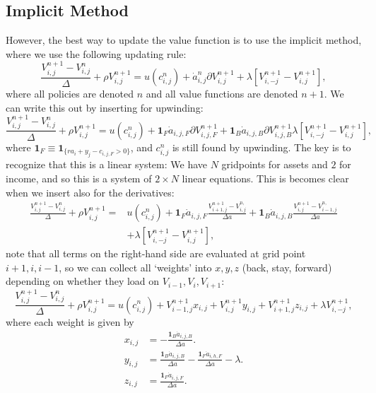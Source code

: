 \documentclass[12pt]{article}
\DeclareMathOperator{\1}{\mathbbm{1}}
\begin{document}
\subsection{Implicit Method}\label{sec:implicitmethod}
However, the best way to update the value function is to use the implicit method, where we use the following updating rule:
\begin{equation}
\frac{V^{n+1}_{i,j} - V^n_{i,j}}\Delta + \rho V^{n+1}_{i,j} =u(c^n_{i,j}) + \dot a^n_{i,j} \partial V^{n+1}_{i,j} + \lambda [V^{n+1}_{i,-j} - V^{n+1}_{i,j}],
\end{equation}
where all policies are denoted $n$ and all value functions are denoted $n+1$. We can write this out by inserting for upwinding:
\begin{equation}
\frac{V^{n+1}_{i,j} - V^n_{i,j}}{\Delta} +  \rho V^{n+1}_{i,j} =u(c^n_{i,j}) + \mathbf{1}_F\dot a_{i,j,F} \partial V^{n+1}_{i,j,F} + \mathbf{1}_B \dot a_{i,j,B} \partial V^{n+1}_{i,j,B} \lambda [V^{n+1}_{i,-j} - V^{n+1}_{i,j}],
\end{equation}
where $\mathbf{1}_F \equiv \mathbf{1}_{\{ra_i + y_j - c_{i,j,F}>0\}}$, and  $c^n_{i,j}$ is still found by upwinding. The key is to recognize that this is a linear system: We have $N$ gridpoints for assets and $2$ for income, and so this is a system of $2\times N$ linear equations. This is becomes clear when we insert also for the derivatives:
\begin{equation}
\begin{split}
\frac{V^{n+1}_{i,j} - V^n_{i,j}}{\Delta} +  \rho V^{n+1}_{i,j} =&u(c^n_{i,j}) + \mathbf{1}_F\dot a_{i,j,F} \frac{V^{n+1}_{i+1,j} - V^{n,}_{i,j}}{\Delta a } + \mathbf{1}_B \dot a_{i,j,B} \frac{V^{n+1}_{i,j} - V^{n,}_{i-1,j}}{\Delta a}  \\
 & + \lambda [V^{n+1}_{i,-j} - V^{n+1}_{i,j}],
\end{split}
\end{equation}
note that all terms on the right-hand side are evaluated at grid point $i+1,i,i-1$, so we can collect all `weights' into $x,y,z$ (back, stay, forward)  depending on whether they load on $V_{i-1},V_i,V_{i+1}$:
\begin{equation}\label{eq:systemeq}
\frac{V^{n+1}_{i,j} - V^n_{i,j}}{\Delta} +  \rho V^{n+1}_{i,j} =u(c^n_{i,j}) + V^{n+1}_{i-1,j}x_{i,j} + V^{n+1}_{i,j}y_{i,j} + V^{n+1}_{i+1,j}z_{i,j}
 + \lambda V^{n+1}_{i,-j},
\end{equation}
where each weight is given by
\begin{align*}
x_{i,j} &=  -\frac{\mathbf{1}_B \dot a_{i,j,B}}{\Delta a}. \\
y_{i,j} &=  \frac{\mathbf{1}_B \dot a_{i,j,B}}{\Delta a} -\frac{\mathbf{1}_F \dot a_{i,h,F}}{\Delta a} - \lambda. \\
z_{i,j} &= \frac{\mathbf{1}_F \dot a_{i,j,F}}{\Delta a}.
\end{align*}
\end{document}
